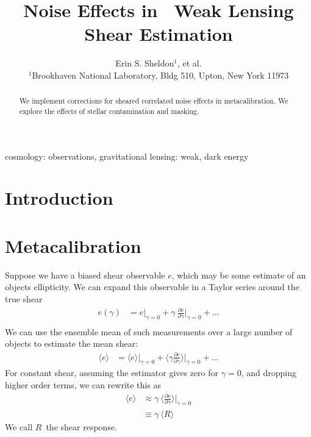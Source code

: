 \documentclass[usegraphicx,usenatbib]{mn2e}
\title{Noise Effects in \Mcal\ Weak Lensing Shear Estimation}
\author[Sheldon et al.]{Erin S. Sheldon$^1$, et al.\\
$^1$Brookhaven National Laboratory, Bldg 510, Upton, New York 11973}
\newcommand{\est}{$e$}
\newcommand{\mest}{e}
\newcommand{\mcal}{metacalibration}
\newcommand{\mcalR}{$R$}
\begin{document}
\maketitle

\begin{abstract}

We implement corrections for sheared correlated noise effects in \mcal. We
explore the effects of stellar contamination and masking.   

\end{abstract}


\begin{keywords}                                                                    
    cosmology: observations,
    gravitational lensing: weak,
    dark energy
\end{keywords} 

\section{Introduction} \label{sec:intro}

\section{Metacalibration} \label{sec:algo}

Suppose we have a biased shear observable \est, which may be some estimate of
an objects ellipticity. We can expand this observable in a Taylor
series around the true shear
\begin{align} \label{eq:Eexpand}
    \mest(\gamma) &= \mest|_{\gamma=0} + \gamma ~ \frac{ \partial \mest }{ \partial \gamma }\bigg|_{\gamma=0}  + ... \\
\end{align}
We can use the ensemble mean of such measurements over a large number of objects
to estimate the mean shear:
\begin{align}
    \langle \mest \rangle &= \langle \mest \rangle |_{\gamma=0} + \langle \gamma \frac{ \partial \mest }{ \partial \gamma } \rangle \bigg|_{\gamma=0} + ...
\end{align}
For constant shear, assuming the estimator gives zero for $\gamma=0$, and
dropping higher order terms, we can rewrite this as
\begin{align}
    \langle \mest \rangle &\approx  \gamma ~ \langle \frac{ \partial \mest }{ \partial \gamma } \rangle \bigg|_{\gamma=0}  \\
      & \equiv  \gamma ~ \langle \mbox{\mcalR} \rangle \nonumber
\end{align}
We call \mcalR\ the shear response.
\end{document}
